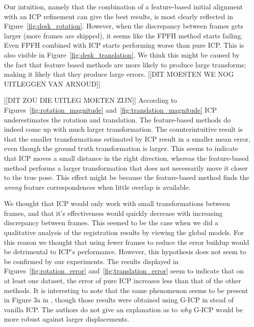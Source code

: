\documentclass[a4paper]{article}
\begin{document}
Our intuition, namely that the combination of a feature-based initial alignment with an \ac{ICP} refinement can give the best results, is most clearly reflected in Figure~\ref{fig:desk_rotation}. However, when the discrepancy between frames gets larger (more frames are skipped), it seems like the \ac{FPFH} method starts failing. Even \ac{FPFH} combined with \ac{ICP} starts performing worse than pure \ac{ICP}. This is also visible in Figure~\ref{fig:desk_translation}. We think this might be caused by the fact that feature based methods are more likely to produce large transforms; making it likely that they produce large errors. [[DIT MOESTEN WE NOG UITLEGGEN VAN ARNOUD]]

[[DIT ZOU DIE UITLEG MOETEN ZIJN]] According to Figures~\ref{fig:rotation_magnitude} and~\ref{fig:translation_magnitude} \ac{ICP} underestimates the rotation and translation. The feature-based methods do indeed come up with much larger transformation. The counterintuitive result is that the smaller transformations estimated by \ac{ICP} result in a smaller mean error, even though the ground truth transformation is larger. This seems to indicate that \ac{ICP} moves a small distance in the right direction, whereas the feature-based method performs a larger transformation that does not necessarily move it closer to the true pose. This effect might be because the feature-based method finds the \emph{wrong} feature correspondences when little overlap is available.

We thought that \ac{ICP} would only work with small transformations between frames, and that it's effectiveness would quickly decrease with increasing discrepancy between frames. This seemed to be the case when we did a qualitative analysis of the registration results by viewing the global models. For this reason we thought that using fewer frames to reduce the error buildup would be detrimental to \ac{ICP}'s performance. However, this hypothesis does not seem to be confirmed by our experiments. The results displayed in Figures~\ref{fig:rotation_error} and~\ref{fig:translation_error} seem to indicate that on at least one dataset, the error of pure \ac{ICP} increases less than that of the other methods. It is interesting to note that the same phenomenon seems to be present in Figure 3a in \cite{steinbruecker_sturm_cremers_iccv11}, though those results were obtained using G-ICP in stead of vanilla \ac{ICP}. The authors do not give an explanation as to \emph{why} G-ICP would be more robust against larger displacements.
\end{document}
